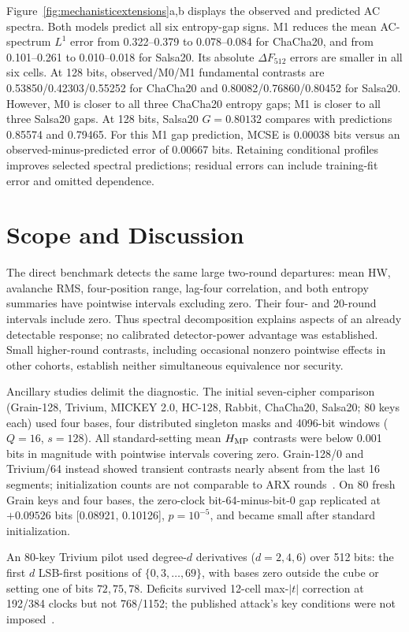 \documentclass[electronics,article,submit,pdftex,oneauthor]{Definitions/mdpi}
\begin{document}
Figure~\ref{fig:mechanisticextensions}a,b displays the observed and predicted AC spectra. Both models predict all six entropy-gap signs. M1 reduces the mean AC-spectrum $L^1$ error from 0.322--0.379 to 0.078--0.084 for ChaCha20, and from 0.101--0.261 to 0.010--0.018 for Salsa20. Its absolute $\Delta F_{512}$ errors are smaller in all six cells. At 128 bits, observed/M0/M1 fundamental contrasts are 0.53850/0.42303/0.55252 for ChaCha20 and 0.80082/0.76860/0.80452 for Salsa20. However, M0 is closer to all three ChaCha20 entropy gaps; M1 is closer to all three Salsa20 gaps. At 128 bits, Salsa20 $G=0.80132$ compares with predictions 0.85574 and 0.79465. For this M1 gap prediction, MCSE is 0.00038 bits versus an observed-minus-predicted error of 0.00667 bits. Retaining conditional profiles improves selected spectral predictions; residual errors can include training-fit error and omitted dependence.

\section{Scope and Discussion}

The direct benchmark detects the same large two-round departures: mean HW, avalanche RMS, four-position range, lag-four correlation, and both entropy summaries have pointwise intervals excluding zero. Their four- and 20-round intervals include zero. Thus spectral decomposition explains aspects of an already detectable response; no calibrated detector-power advantage was established. Small higher-round contrasts, including occasional nonzero pointwise effects in other cohorts, establish neither simultaneous equivalence nor security.

Ancillary studies delimit the diagnostic. The initial seven-cipher comparison (Grain-128, Trivium, MICKEY 2.0, HC-128, Rabbit, ChaCha20, Salsa20; 80 keys each) used four bases, four distributed singleton masks and 4096-bit windows ($Q=16$, $s=128$). All standard-setting mean $H_{\rm MP}$ contrasts were below 0.001 bits in magnitude with pointwise intervals covering zero. Grain-128/0 and Trivium/64 instead showed transient contrasts nearly absent from the last 16 segments; initialization counts are not comparable to ARX rounds~\citep{grain2006,trivium2006,estream2008}. On 80 fresh Grain keys and four bases, the zero-clock bit-64-minus-bit-0 gap replicated at $+0.09526$ bits [0.08921, 0.10126], $p=10^{-5}$, and became small after standard initialization.

An 80-key Trivium pilot used degree-$d$ derivatives ($d=2,4,6$) over 512 bits: the first $d$ LSB-first positions of $\{0,3,\ldots,69\}$, with bases zero outside the cube or setting one of bits $72,75,78$. Deficits survived 12-cell max-$|t|$ correction at 192/384 clocks but not 768/1152; the published attack's key conditions were not imposed~\citep{knellwolf2011}.
\end{document}
